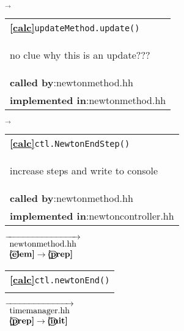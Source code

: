 \begin{landscape}
{\begin{tabular}{|l|}
      \hline 
  \end{tabular}
    $\overrightarrow{
    }$
    \nextline
    \begin{tabular}{|l|}
      \hline
      \textbf{\textcircled{\ref{calc}}}\verb+updateMethod.update()+ \\
      \begin{scriptsize}no clue why this is an update???\end{scriptsize}\\      
      \textbf{called by}:newtonmethod.hh\\
      \textbf{implemented in}:newtonmethod.hh \\  
      \hline 
  \end{tabular}
    $\overrightarrow{
    }$
    \begin{tabular}{|l|}
      \hline
      \textbf{\textcircled{\ref{calc}}}\verb+ctl.NewtonEndStep()+ \\
      \begin{scriptsize}increase steps and write to console\end{scriptsize}\\
      \textbf{called by}:newtonmethod.hh\\
      \textbf{implemented in}:newtoncontroller.hh\\  
      \hline 
  \end{tabular}
    {\scriptsize$\overrightarrow{
    \begin{array}{l}
     \textnormal{newtonmethod.hh}\\
     \textbf{\textcircled{\ref{elem}}} \rightarrow \textbf{\textcircled{\ref{prep}}}
    \end{array}
    }$}
    \begin{tabular}{|l|}
      \hline
      \textbf{\textcircled{\ref{calc}}}\verb+ctl.newtonEnd()+ \\
      \begin{scriptsize}\end{scriptsize}\\      
	\hline 
    \end{tabular}
    {\scriptsize$\overrightarrow{
    \begin{array}{l}
    \textnormal{timemanager.hh}\\
    \textbf{\textcircled{\ref{prep}}} \rightarrow \textbf{\textcircled{\ref{init}}}
    \end{array}
    }$}
}
\end{landscape}


\normalsize